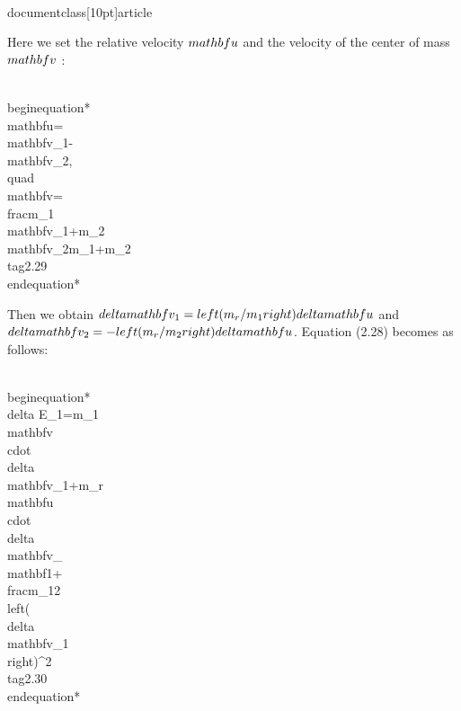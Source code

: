 \\documentclass[10pt]{article}
\begin{document}
Here we set the relative velocity $\\mathbf{u}$ and the velocity of the center of mass $\\mathbf{v}$ :


\\begin{equation*}
\\mathbf{u}=\\mathbf{v}_{1}-\\mathbf{v}_{2}, \\quad \\mathbf{v}=\\frac{m_{1} \\mathbf{v}_{1}+m_{2} \\mathbf{v}_{2}}{m_{1}+m_{2}} \\tag{2.29}
\\end{equation*}


Then we obtain $\\delta \\mathbf{v}_{1}=\\left(m_{r} / m_{1}\\right) \\delta \\mathbf{u}$ and $\\delta \\mathbf{v}_{2}=-\\left(m_{r} / m_{2}\\right) \\delta \\mathbf{u}$. Equation (2.28) becomes as follows:


\\begin{equation*}
\\delta E_{1}=m_{1} \\mathbf{v} \\cdot \\delta \\mathbf{v}_{1}+m_{r} \\mathbf{u} \\cdot \\delta \\mathbf{v}_{\\mathbf{1}}+\\frac{m_{1}}{2}\\left(\\delta \\mathbf{v}_{1}\\right)^{2} \\tag{2.30}
\\end{equation*}
\end{document}
